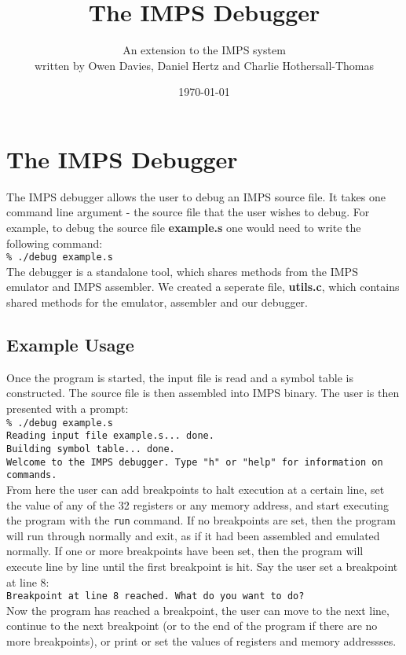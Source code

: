 \documentclass[11pt]{report}
\begin{document}
\setlength{\topmargin}{-1cm}
\setlength{\parindent}{0in}

\title{The IMPS Debugger}
\author{An extension to the IMPS system\\written by Owen Davies, Daniel Hertz and Charlie Hothersall-Thomas}
\date{ \today}

\maketitle
\section*{The IMPS Debugger}

The IMPS debugger allows the user to debug an IMPS source file. It takes one 
command line argument - the source file that the user wishes to debug. For 
example, to debug the source file \textbf{example.s} one would need to write 
the following command:
\\[2ex]
\texttt{\% ./debug example.s}
\\[2ex]
The debugger is a standalone tool, which shares methods from the IMPS emulator 
and IMPS assembler. We created a seperate file, \textbf{utils.c}, which contains 
shared methods for the emulator, assembler and our debugger.

\subsection*{Example Usage}

Once the program is started, the input file is read and a symbol table is 
constructed. The source file is then assembled into IMPS binary. The user is 
then presented with a prompt:
\\[2ex]
\texttt{\% ./debug example.s\\
		Reading input file example.s... done.\\
		Building symbol table... done.\\
		Welcome to the IMPS debugger. Type "h" or "help" for information on commands.}
\\[2ex]
From here the user can add breakpoints to halt execution at a certain line, set 
the value of any of the 32 registers or any memory address, and start executing 
the program with the \texttt{run} command. If no breakpoints are set, then the
program will run through normally and exit, as if it had been assembled and
emulated normally. If one or more breakpoints have been set, then the program
will execute line by line until the first breakpoint is hit. Say the user set a
breakpoint at line 8:
\\[2ex]
\texttt{Breakpoint at line 8 reached. What do you want to do?}
\\[2ex]
Now the program has reached a breakpoint, the user can move to the next line, 
continue to the next breakpoint (or to the end of the program if there are no 
more breakpoints), or print or set the values of registers and memory 
addressses.
\end{document}
